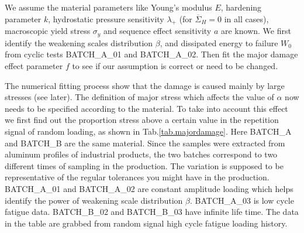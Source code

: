 We assume the material parameters like Young's modulus $E$, hardening parameter $k$, hydrostatic pressure sensitivity $\lambda_+$ (for $\overline{\Sigma}_H=0$ in all cases), macroscopic yield stress $\sigma_y$ and sequence effect sensitivity $a$ are known. We first identify the weakening scales distribution $\beta$, and dissipated energy to failure $W_0$ from cyclic tests BATCH\_A\_01 and BATCH\_A\_02. Then fit the major damage effect parameter $f$ to see if our assumption is correct or need to be changed. 


The numerical fitting process show that the damage is caused mainly by large stresses (see later). The definition of major stress which affects the value of $\alpha$ now needs to be specified according to the material. To take into account this effect we first find out the proportion stress above a certain value in the repetition signal of random loading, as shown in Tab.\ref{tab.majordamage}.  Here BATCH\_A and BATCH\_B are the same material. Since the samples were extracted from aluminum profiles of industrial products,  the two batches correspond to two different times of sampling in the production. The variation is supposed to be representative of the regular tolerances you might have in the production. BATCH\_A\_01 and BATCH\_A\_02 are constant amplitude loading which helps identify the power of weakening scale distribution $\beta$. BATCH\_A\_03 is low cycle fatigue data.  BATCH\_B\_02 and BATCH\_B\_03 have infinite life time. The data in the table are grabbed from random signal high cycle fatigue loading history.

